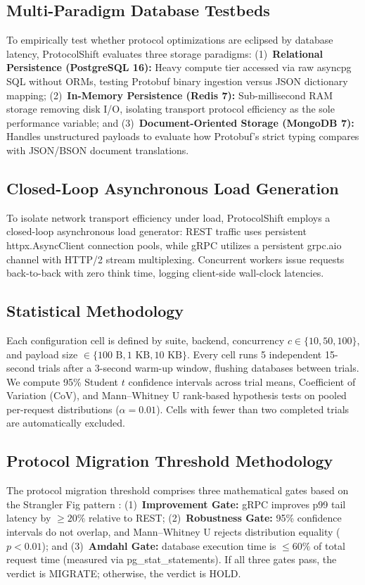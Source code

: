 \documentclass[conference]{IEEEtran}
\begin{document}
\subsection{Multi-Paradigm Database Testbeds}
To empirically test whether protocol optimizations are eclipsed by database latency, ProtocolShift evaluates three storage paradigms: (1)~\textbf{Relational Persistence (PostgreSQL 16):} Heavy compute tier accessed via raw asyncpg SQL without ORMs, testing Protobuf binary ingestion versus JSON dictionary mapping; (2)~\textbf{In-Memory Persistence (Redis 7):} Sub-millisecond RAM storage removing disk I/O, isolating transport protocol efficiency as the sole performance variable; and (3)~\textbf{Document-Oriented Storage (MongoDB 7):} Handles unstructured payloads to evaluate how Protobuf's strict typing compares with JSON/BSON document translations.

\subsection{Closed-Loop Asynchronous Load Generation}
To isolate network transport efficiency under load, ProtocolShift employs a closed-loop asynchronous load generator: REST traffic uses persistent httpx.AsyncClient connection pools, while gRPC utilizes a persistent grpc.aio channel with HTTP/2 stream multiplexing. Concurrent workers issue requests back-to-back with zero think time, logging client-side wall-clock latencies.

\subsection{Statistical Methodology}
Each configuration cell is defined by suite, backend, concurrency $c \in \{10, 50, 100\}$, and payload size $\in \{100\text{ B}, 1\text{ KB}, 10\text{ KB}\}$. Every cell runs 5 independent 15-second trials after a 3-second warm-up window, flushing databases between trials. We compute 95\% Student $t$ confidence intervals across trial means, Coefficient of Variation (CoV), and Mann--Whitney U rank-based hypothesis tests on pooled per-request distributions ($\alpha = 0.01$). Cells with fewer than two completed trials are automatically excluded.



\subsection{Protocol Migration Threshold Methodology}
The protocol migration threshold comprises three mathematical gates based on the Strangler Fig pattern \cite{li2020}: (1)~\textbf{Improvement Gate:} gRPC improves p99 tail latency by $\ge 20\%$ relative to REST; (2)~\textbf{Robustness Gate:} 95\% confidence intervals do not overlap, and Mann--Whitney U rejects distribution equality ($p<0.01$); and (3)~\textbf{Amdahl Gate:} database execution time is $\le 60\%$ of total request time (measured via pg\_stat\_statements). If all three gates pass, the verdict is MIGRATE; otherwise, the verdict is HOLD.
\end{document}
